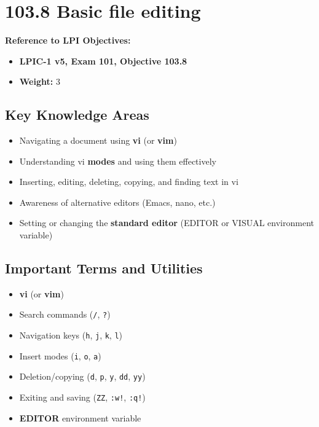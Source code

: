 \documentclass[a4paper]{report}
\begin{document}
\section*{103.8 Basic file editing}

\textbf{Reference to LPI Objectives:}
\begin{itemize}
    \item \textbf{LPIC-1 v5, Exam 101, Objective 103.8}
    \item \textbf{Weight:} 3
\end{itemize}

\subsection*{Key Knowledge Areas}
\begin{itemize}
    \item Navigating a document using \textbf{vi} (or \textbf{vim})
    \item Understanding vi \textbf{modes} and using them effectively
    \item Inserting, editing, deleting, copying, and finding text in vi
    \item Awareness of alternative editors (Emacs, nano, etc.)
    \item Setting or changing the \textbf{standard editor} (EDITOR or VISUAL environment variable)
\end{itemize}

\subsection*{Important Terms and Utilities}
\begin{itemize}
    \item \textbf{vi} (or \textbf{vim})
    \item Search commands (\texttt{/}, \texttt{?})
    \item Navigation keys (\texttt{h}, \texttt{j}, \texttt{k}, \texttt{l})
    \item Insert modes (\texttt{i}, \texttt{o}, \texttt{a})
    \item Deletion/copying (\texttt{d}, \texttt{p}, \texttt{y}, \texttt{dd}, \texttt{yy})
    \item Exiting and saving (\texttt{ZZ}, \texttt{:w!}, \texttt{:q!})
    \item \textbf{EDITOR} environment variable
\end{itemize}
\end{document}
